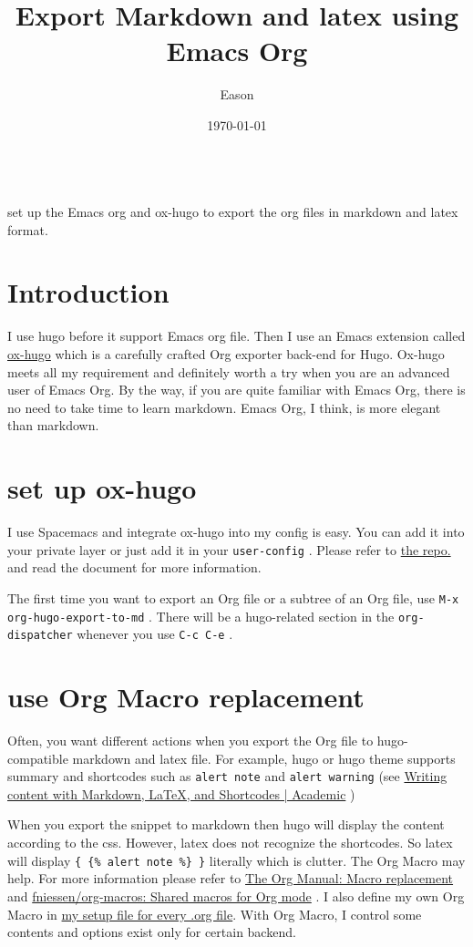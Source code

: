 \documentclass[koma,a4paper,utopia,12pt,listings-color,microtype,paralist,colorlinks,urlcolor=red]{org-article}
\author{Eason}
\date{\today}
\title{Export Markdown and latex using Emacs Org}
\begin{document}
\hspace{0pt}\\


set up the Emacs org and ox-hugo to export the org files in markdown and latex format.


\section{Introduction}
\label{sec:orgc771d89}


I use hugo before it support Emacs org file. Then I use an Emacs extension
called \href{https://github.com/kaushalmodi/ox-hugo}{ox-hugo} which is a carefully crafted Org exporter back-end for Hugo.
Ox-hugo meets all my requirement and definitely worth a try when you are an
advanced user of Emacs Org. By the way, if you are quite familiar with Emacs
Org, there is no need to take time to learn markdown. Emacs Org, I think, is
more elegant than markdown.

\section{set up ox-hugo}
\label{sec:orgd4e98d9}


I use Spacemacs and integrate ox-hugo into my config is easy. You can add it
into your private layer or just add it in your \texttt{user-config} . Please refer to
\href{https://github.com/kaushalmodi/ox-hugo}{the repo.} and read the document for more information.

The first time you want to export an Org file or a subtree of an Org file, use
\texttt{M-x org-hugo-export-to-md} . There will be a hugo-related section in the
\texttt{org-dispatcher} whenever you use \texttt{C-c C-e} .
\section{use Org Macro replacement}
\label{sec:org3a92f3b}


Often, you want different actions when you export the Org file to
hugo-compatible markdown and latex file. For example, hugo or hugo theme supports
summary and shortcodes such as \texttt{alert note} and \texttt{alert warning} (see  \href{https://sourcethemes.com/academic/docs/writing-markdown-latex/}{Writing
content with Markdown, \LaTeX{}, and Shortcodes | Academic} )

When you export the snippet to markdown then hugo will display the content
according to the css. However, latex does not recognize the shortcodes. So latex
will display \texttt{\{ \{\% alert note \%\} \}} literally which is clutter. The Org Macro may
help. For more information please refer to \href{https://orgmode.org/manual/Macro-replacement.html}{The Org Manual: Macro replacement} and
\href{https://github.com/fniessen/org-macros}{fniessen/org-macros: Shared macros for Org mode} . I also define my own Org Macro
in \href{https://github.com/msteamc/.spacemacs.d/blob/master/org-templates/enpost.org}{my setup file for every .org file}. With Org Macro, I control some contents
and options exist only for certain backend.
\end{document}
